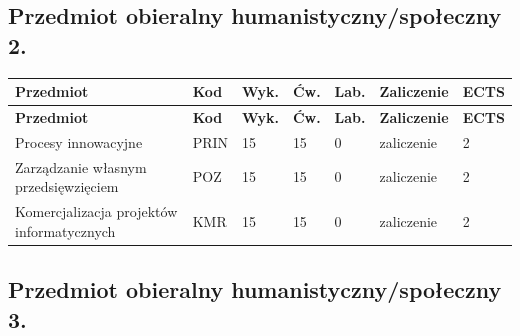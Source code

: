 \documentclass[12pt,a4paper]{article}
\newcommand{\thdrule}{\noalign{\global\setlength{\extrarowheight}{0pt}}}
\newcommand{\thdend}{\noalign{\global\setlength{\extrarowheight}{4pt}}}
\begin{document}
\subsection*{Przedmiot obieralny humanistyczny/społeczny 2.}

{\scriptsize
\begin{longtable}{m{5.5cm}m{0.8cm}m{1cm}m{1cm}m{1cm}m{1.7cm}m{0.7cm}}
\thdrule\toprule
\rowcolor{pjatkRed}
{\color{white}\footnotesize\textbf{\vphantom{Ag}Przedmiot}} & {\color{white}\footnotesize\textbf{\vphantom{Ag}Kod}} & {\color{white}\footnotesize\textbf{\vphantom{Ag}Wyk.}} & {\color{white}\footnotesize\textbf{\vphantom{Ag}Ćw.}} & {\color{white}\footnotesize\textbf{\vphantom{Ag}Lab.}} & {\color{white}\footnotesize\textbf{\vphantom{Ag}Zaliczenie}} & {\color{white}\footnotesize\textbf{\vphantom{Ag}ECTS}} \\
\midrule\thdend
\endfirsthead
\thdrule\toprule
\rowcolor{pjatkRed}
{\color{white}\footnotesize\textbf{\vphantom{Ag}Przedmiot}} & {\color{white}\footnotesize\textbf{\vphantom{Ag}Kod}} & {\color{white}\footnotesize\textbf{\vphantom{Ag}Wyk.}} & {\color{white}\footnotesize\textbf{\vphantom{Ag}Ćw.}} & {\color{white}\footnotesize\textbf{\vphantom{Ag}Lab.}} & {\color{white}\footnotesize\textbf{\vphantom{Ag}Zaliczenie}} & {\color{white}\footnotesize\textbf{\vphantom{Ag}ECTS}} \\
\midrule\thdend
\endhead
\rowcolor{tableRowLight} Procesy innowacyjne & PRIN & 15 & 15 & 0 & {\scriptsize zaliczenie} & 2 \\
\rowcolor{tableRowAlt} Zarządzanie własnym przedsięwzięciem & POZ & 15 & 15 & 0 & {\scriptsize zaliczenie} & 2 \\
\rowcolor{tableRowLight} Komercjalizacja projektów informatycznych & KMR & 15 & 15 & 0 & {\scriptsize zaliczenie} & 2 \\
\bottomrule
\end{longtable}}

\subsection*{Przedmiot obieralny humanistyczny/społeczny 3.}
\end{document}
